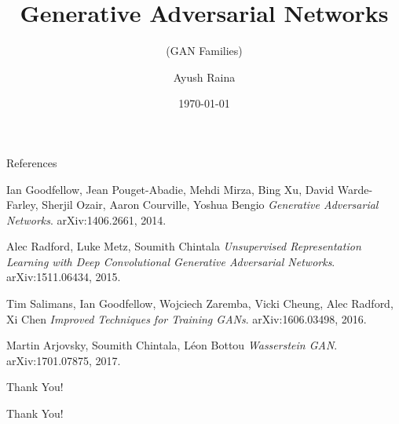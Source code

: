 \documentclass{beamer}
\author{Ayush Raina}
\title{Generative Adversarial Networks}
\subtitle{(GAN Families)}
\institute{
    Indian Institute of Science \\
}
\date{\today}
\begin{document}
\begin{frame}
    \titlepage
\end{frame}
      


\begin{frame}{References}
    \begin{thebibliography}{9}
        Ian Goodfellow, Jean Pouget-Abadie, Mehdi Mirza, Bing Xu, David Warde-Farley, Sherjil Ozair, Aaron Courville, Yoshua Bengio
        \textit{Generative Adversarial Networks}.
        arXiv:1406.2661, 2014.
        
        Alec Radford, Luke Metz, Soumith Chintala
        \textit{Unsupervised Representation Learning with Deep Convolutional Generative Adversarial Networks}.
        arXiv:1511.06434, 2015.
        
        Tim Salimans, Ian Goodfellow, Wojciech Zaremba, Vicki Cheung, Alec Radford, Xi Chen
        \textit{Improved Techniques for Training GANs}.
        arXiv:1606.03498, 2016.
        
        Martin Arjovsky, Soumith Chintala, Léon Bottou
        \textit{Wasserstein
        GAN}.
        arXiv:1701.07875, 2017.
    \end{thebibliography}
\end{frame}

\begin{frame}{Thank You!}
    \begin{center}
        \Huge Thank You!
    \end{center}
\end{frame}
\end{document}
